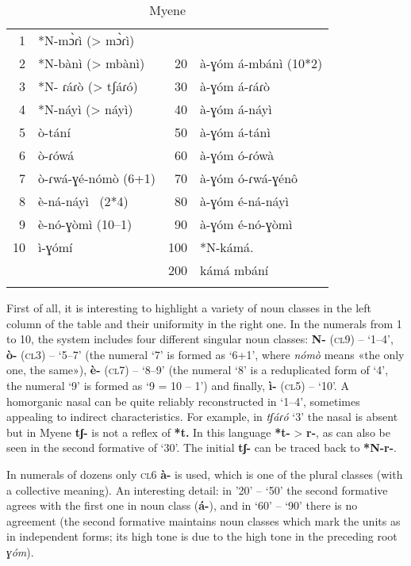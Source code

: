 \begin{table}
\caption{\label{tab:1:10} Myene }
\begin{tabularx}{\textwidth}{rXrX}
\lsptoprule

1  &*N-m{\`{ɔ}}ɾì (> m{\`{ɔ}}ɾì) & \\
2  &*N-bànì (> mbànì)  		& 20  &à-ɣóm á-mbánì      (10*2)\\
3  &*N- ɾáɾò (> tʃáɾó) 		& 30  & à-ɣóm á-ɾáɾò\\
4  &*N-náyì  (> náyì)  		& 40  & à-ɣóm á-náyì\\
5  &ò-tání 				& 50  & à-ɣóm á-tánì\\
6  &ò-ɾówá 				& 60  & à-ɣóm ó-ɾówà\\
7  &ò-ɾwá-ɣ{\'{e}}-nómò (6+1) 	& 70  & à-ɣóm ó-ɾwá-ɣ{\'{e}}n{\^{o}}\\
8  &è-ná-náyì~   (2*4) 		& 80  & à-ɣóm {\'{e}}-ná-náyì \\
9  &è-nó-ɣòmì   (10–1) 		& 90  & à-ɣóm {\'{e}}-nó-ɣòmì\\
10 & ì-ɣómí ~ 			& 100 & *N-kámá. \\
   &           						& 200 & kámá mbání\\
\lspbottomrule
\end{tabularx}
\end{table}

First of all, it is interesting to highlight a variety of noun classes in the left column of the table and their uniformity in the right one. In the numerals from 1 to 10, the system includes four different singular noun classes: \textbf{N-} (\textsc{cl}9) – ‘1--4’, \textbf{ò-} (\textsc{cl}3) – ‘5--7’ (the numeral ‘7’ is formed as ‘6+1’, where \textit{nómò} means «the only one, the same»), \textbf{è-} (\textsc{cl}7) – ‘8--9’ (the numeral ‘8’  is a reduplicated form of ‘4’, the numeral ‘9’ is formed as ‘9 = 10 – 1’) and finally, \textbf{ì-} (\textsc{cl}5) – ‘10’. A homorganic nasal can be quite reliably reconstructed in ‘1--4’, sometimes appealing to indirect characteristics. For example, in \textit{tʃáɾó} ‘3’ the nasal is absent but in Myene \textbf{tʃ-} is not a reflex of \textbf{*t.}  In this language  \textbf{*t-} > \textbf{r-}, as can also be seen in the second formative of ‘30’. The initial \textbf{tʃ-} can be traced back to \textbf{*N-r-}.

In numerals of dozens only \textsc{cl}6 \textbf{à-}  is used, which is one of the plural classes (with a collective meaning). An interesting detail: in ’20’ – ‘50’ the second formative agrees with the first one in noun class  (\textbf{á-}), and in ‘60’ – ‘90’ there is no agreement (the second formative maintains noun classes which mark the units as in independent forms; its high tone is due to the high tone in the preceding root \textit{ɣóm}). 


